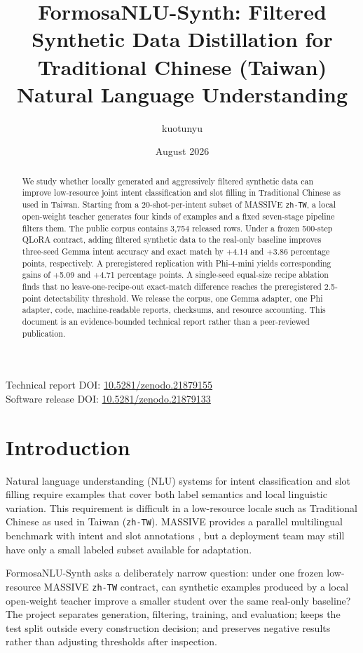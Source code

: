 \documentclass[11pt]{article}
\title{FormosaNLU-Synth: Filtered Synthetic Data Distillation for\\
Traditional Chinese (Taiwan) Natural Language Understanding}
\author{kuotunyu}
\date{August 2026}
\begin{document}
\maketitle

\begin{center}
\small
Technical report DOI:
\href{https://doi.org/10.5281/zenodo.21879155}{10.5281/zenodo.21879155}\\
Software release DOI:
\href{https://doi.org/10.5281/zenodo.21879133}{10.5281/zenodo.21879133}
\end{center}

\begin{abstract}
We study whether locally generated and aggressively filtered synthetic data can
improve low-resource joint intent classification and slot filling in Traditional
Chinese as used in Taiwan.  Starting from a 20-shot-per-intent subset of MASSIVE
\texttt{zh-TW}, a local open-weight teacher generates four kinds of examples and
a fixed seven-stage pipeline filters them.  The public corpus contains 3,754
released rows.  Under a frozen 500-step QLoRA contract, adding filtered synthetic
data to the real-only baseline improves three-seed Gemma intent accuracy and
exact match by +4.14 and +3.86 percentage points, respectively.  A preregistered
replication with Phi-4-mini yields corresponding gains of +5.09 and +4.71
percentage points.  A single-seed equal-size recipe ablation finds that no
leave-one-recipe-out exact-match difference reaches the preregistered 2.5-point
detectability threshold.  We release the corpus, one Gemma adapter, one Phi
adapter, code, machine-readable reports, checksums, and resource accounting.
This document is an evidence-bounded technical report rather than a
peer-reviewed publication.
\end{abstract}

\section{Introduction}
Natural language understanding (NLU) systems for intent classification and slot
filling require examples that cover both label semantics and local linguistic
variation.  This requirement is difficult in a low-resource locale such as
Traditional Chinese as used in Taiwan (\texttt{zh-TW}).  MASSIVE provides a
parallel multilingual benchmark with intent and slot annotations
\citep{fitzgerald2023massive}, but a deployment team may still have only a small
labeled subset available for adaptation.

FormosaNLU-Synth asks a deliberately narrow question: under one frozen low-
resource MASSIVE \texttt{zh-TW} contract, can synthetic examples produced by a
local open-weight teacher improve a smaller student over the same real-only
baseline?  The project separates generation, filtering, training, and evaluation;
keeps the test split outside every construction decision; and preserves negative
results rather than adjusting thresholds after inspection.
\end{document}
